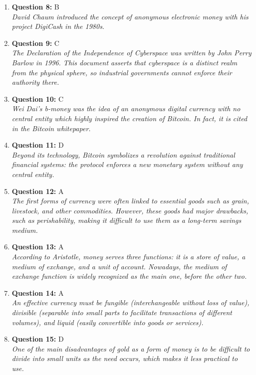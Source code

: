 \documentclass[12pt,a4paper]{article}
\begin{document}
\begin{enumerate}
\item \textbf{Question 8:} B
\\ \textit{David Chaum introduced the concept of anonymous electronic money with his project DigiCash in the 1980s.}

\item \textbf{Question 9:} C
\\ \textit{The Declaration of the Independence of Cyberspace was written by John Perry Barlow in 1996. This document asserts that cyberspace is a distinct realm from the physical sphere, so industrial governments cannot enforce their authority there.}

\item \textbf{Question 10:} C
\\ \textit{Wei Dai's b-money was the idea of an anonymous digital currency with no central entity which highly inspired the creation of Bitcoin. In fact, it is cited in the Bitcoin whitepaper.}

\item \textbf{Question 11:} D
\\ \textit{Beyond its technology, Bitcoin symbolizes a revolution against traditional financial systems: the protocol enforces a new monetary system without any central entity.}

\item \textbf{Question 12:} A
\\ \textit{The first forms of currency were often linked to essential goods such as grain, livestock, and other commodities. However, these goods had major drawbacks, such as perishability, making it difficult to use them as a long-term savings medium.}

\item \textbf{Question 13:} A
\\ \textit{According to Aristotle, money serves three functions: it is a store of value, a medium of exchange, and a unit of account. Nowadays, the medium of exchange function is widely recognized as the main one, before the other two.}

\item \textbf{Question 14:} A
\\ \textit{An effective currency must be fungible (interchangeable without loss of value), divisible (separable into small parts to facilitate transactions of different volumes), and liquid (easily convertible into goods or services).}

\item \textbf{Question 15:} D
\\ \textit{One of the main disadvantages of gold as a form of money is to be difficult to divide into small units as the need occurs, which makes it less practical to use.}


\end{enumerate}
\end{document}

